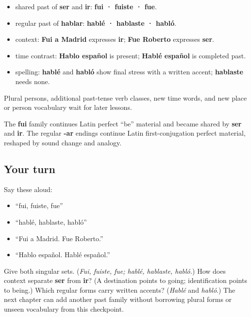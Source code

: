 \begin{grammarlens}[title={Grammar Lens: the complete frame for this chapter}]
\begin{itemize}
\raggedright
  \item shared past of \textbf{ser} and \textbf{ir}: \textbf{fui · fuiste · fue}.
  \item regular past of \textbf{hablar}: \textbf{hablé · hablaste · habló}.
  \item context: \textbf{Fui a Madrid} expresses \textbf{ir}; \textbf{Fue Roberto} expresses \textbf{ser}.
  \item time contrast: \textbf{Hablo español} is present; \textbf{Hablé español} is completed past.
  \item spelling: \textbf{hablé} and \textbf{habló} show final stress with a written accent; \textbf{hablaste} needs none.
\end{itemize}

Plural persons, additional past-tense verb classes, new time words, and new place or person vocabulary wait for later lessons.
\end{grammarlens}

\begin{cousinweb}
The \textbf{fui} family continues Latin perfect “be” material and became shared by \textbf{ser} and \textbf{ir}. The regular \textbf{-ar} endings continue Latin first-conjugation perfect material, reshaped by sound change and analogy.
\end{cousinweb}

\subsection*{Your turn}
Say these aloud:

\begin{itemize}
\raggedright
  \item “fui, fuiste, fue”
  \item “hablé, hablaste, habló”
  \item “Fui a Madrid. Fue Roberto.”
  \item “Hablo español. Hablé español.”
\end{itemize}

\begin{tcolorbox}[breakable,colback=teal!4,colframe=teal!35!black,title={Before you move on}]
Give both singular sets. (\emph{Fui, fuiste, fue; hablé, hablaste, habló.}) How does context separate \textbf{ser} from \textbf{ir}? (A destination points to going; identification points to being.) Which regular forms carry written accents? (\emph{Hablé} and \emph{habló}.) The next chapter can add another past family without borrowing plural forms or unseen vocabulary from this checkpoint.
\end{tcolorbox}
